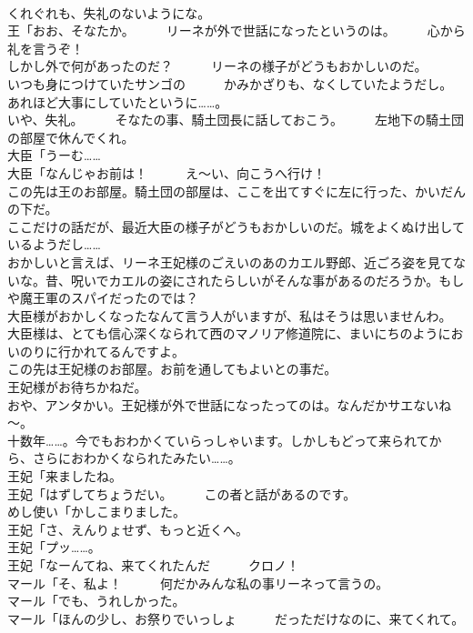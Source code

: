 \documentclass[8pt]{extreport}
\begin{document}
\begin{CJK}{UTF8}{min}
\\	くれぐれも、失礼のないようにな。	
\\	王「おお、そなたか。　　　リーネが外で世話になったというのは。　　　心から礼を言うぞ！	
\\	しかし外で何があったのだ？　　　リーネの様子がどうもおかしいのだ。	
\\	いつも身につけていたサンゴの　　　かみかざりも、なくしていたようだし。　　　あれほど大事にしていたというに……。	
\\	いや、失礼。　　　そなたの事、騎土団長に話しておこう。　　　左地下の騎土団の部屋で休んでくれ。	
\\	大臣「うーむ……	
\\	大臣「なんじゃお前は！　　　え～い、向こうへ行け！	
\\	この先は王のお部屋。騎土団の部屋は、ここを出てすぐに左に行った、かいだんの下だ。	
\\	ここだけの話だが、最近大臣の様子がどうもおかしいのだ。城をよくぬけ出しているようだし……	
\\	おかしいと言えば、リーネ王妃様のごえいのあのカエル野郎、近ごろ姿を見てないな。昔、呪いでカエルの姿にされたらしいがそんな事があるのだろうか。もしや魔王軍のスパイだったのでは？	
\\	大臣様がおかしくなったなんて言う人がいますが、私はそうは思いませんわ。	
\\	大臣様は、とても信心深くなられて西のマノリア修道院に、まいにちのようにおいのりに行かれてるんですよ。	
\\	この先は王妃様のお部屋。お前を通してもよいとの事だ。	
\\	王妃様がお待ちかねだ。	
\\	おや、アンタかい。王妃様が外で世話になったってのは。なんだかサエないね～。	
\\	十数年……。今でもおわかくていらっしゃいます。しかしもどって来られてから、さらにおわかくなられたみたい……。	
\\	王妃「来ましたね。	
\\	王妃「はずしてちょうだい。　　　この者と話があるのです。	
\\	めし使い「かしこまりました。	
\\	王妃「さ、えんりょせず、もっと近くへ。	
\\	王妃「プッ……。	
\\	王妃「なーんてね、来てくれたんだ　　　クロノ！	
\\	マール「そ、私よ！　　　何だかみんな私の事リーネって言うの。	
\\	マール「でも、うれしかった。	
\\	マール「ほんの少し、お祭りでいっしょ　　　だっただけなのに、来てくれて。	

\end{CJK}
\end{document}

